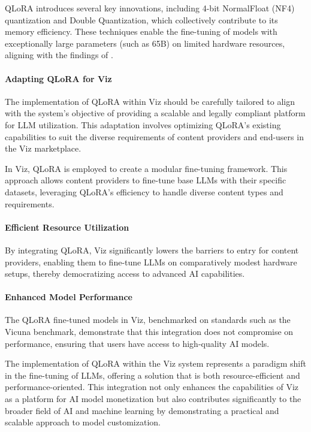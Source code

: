 \documentclass{article}
\begin{document}
QLoRA introduces several key innovations, including 4-bit NormalFloat (NF4) quantization and Double Quantization, which collectively contribute to its memory efficiency. These techniques enable the fine-tuning of models with exceptionally large parameters (such as 65B) on limited hardware resources, aligning with the findings of \cite{hu2021lora}.

\paragraph{Adapting QLoRA for Viz} The implementation of QLoRA within Viz should be carefully tailored to align with the system's objective of providing a scalable and legally compliant platform for LLM utilization. This adaptation involves optimizing QLoRA's existing capabilities to suit the diverse requirements of content providers and end-users in the Viz marketplace.

In Viz, QLoRA is employed to create a modular fine-tuning framework. This approach allows content providers to fine-tune base LLMs with their specific datasets, leveraging QLoRA's efficiency to handle diverse content types and requirements.

\paragraph{Efficient Resource Utilization} By integrating QLoRA, Viz significantly lowers the barriers to entry for content providers, enabling them to fine-tune LLMs on comparatively modest hardware setups, thereby democratizing access to advanced AI capabilities.

\paragraph{Enhanced Model Performance} The QLoRA fine-tuned models in Viz, benchmarked on standards such as the Vicuna benchmark, demonstrate that this integration does not compromise on performance, ensuring that users have access to high-quality AI models.

The implementation of QLoRA within the Viz system represents a paradigm shift in the fine-tuning of LLMs, offering a solution that is both resource-efficient and performance-oriented. This integration not only enhances the capabilities of Viz as a platform for AI model monetization but also contributes significantly to the broader field of AI and machine learning by demonstrating a practical and scalable approach to model customization.
\end{document}
